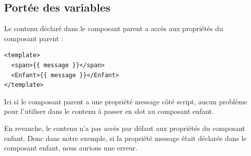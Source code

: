 \documentclass{article}
\begin{document}
\subsection{Portée des variables}
Le contenu déclaré dans le composant parent a accès aux propriétés du composant parent :
\begin{verbatim}
<template>
  <span>{{ message }}</span>
  <Enfant>{{ message }}</Enfant>
</template>
\end{verbatim}
Ici si le composant parent a une propriété {\color{monOrange}message} côté {\color{monOrange}script}, aucun problème pour l'utiliser dans le contenu à passer en {\color{monOrange}slot} au composant enfant.

En revanche, le contenu n'a pas accès par défaut aux propriétés du composant enfant. Donc dans notre exemple, si la propriété {\color{monOrange}message} était déclarée dans le composant enfant, nous aurions une erreur.
\end{document}
